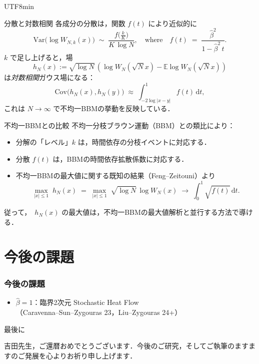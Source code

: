 \documentclass{beamer}
\newcommand{\IE}{\mathbb E}
\begin{document}
\begin{CJK*}{UTF8}{min}
\begin{frame}{分散と対数相関}
\small
各成分の分散は，関数 $f(t)$ により近似的に
\[
    \mathrm{Var}\bigl(\log W_{N,k}(x)\bigr) 
    \;\sim\; 
    \frac{f\bigl(\tfrac{k}{K}\bigr)}{K \,\log N},
    \quad
    \text{where}
    \quad
    f(t) \;=\; \frac{\hat{\beta}^2}{1 - \hat{\beta}^2\,t}.
\]
$k$ で足し上げると，場
\[
    h_N(x) := \sqrt{\log N}\,(\log W_N(\sqrt{N} x)-\IE \log W_N(\sqrt{N} x))
\]
は\emph{対数相関}ガウス場になる：
\[
    \mathrm{Cov}\bigl(h_N(x), h_N(y)\bigr)
    \;\approx\; 
    \int_{-2 \log |x-y|}^1 f(t) \, \mathrm{d}t,
\]
これは $N\to\infty$ で不均一BBMの挙動を反映している．
\end{frame}

\begin{frame}{不均一BBMとの比較}
\small
不均一分枝ブラウン運動（BBM）との類比により：
\begin{itemize}
    \item 分解の「レベル」$k$ は，時間依存の分枝イベントに対応する．
    \item 分散 $f(t)$ は，BBMの時間依存拡散係数に対応する．
    \item 不均一BBMの最大値に関する既知の結果（Feng--Zeitouni）より
\[
        \max_{|x|\le 1} \;h_N(x)
        \;=\;
        \max_{|x|\le 1} \;\sqrt{\log N}\,\log W_N(x)
        \;\longrightarrow\;
        \int_0^1 \sqrt{f(t)}\,\mathrm{d}t.
\]
\end{itemize}
従って，　$h_N(x)$ の最大値は，不均一BBMの最大値解析と並行する方法で導ける．

{\color{red}{厳密な証明では，十分良い近似のためにモーメント評価に関する良い評価が必要になる．}}
\end{frame}

\section{今後の課題}

\begin{frame}


\frametitle{今後の課題}
\begin{itemize}
\item<1-> $\hat \beta = 1$：臨界2次元 Stochastic Heat Flow\\
（Caravenna--Sun--Zygouras 23，Liu--Zygouras 24+）
\end{itemize}
\end{frame}
\begin{frame}{最後に}


{\Large  吉田先生，ご還暦おめでとうございます．今後のご研究，そしてご執筆のますますのご発展を心よりお祈り申し上げます．}
\end{frame}
\end{CJK*}
\end{document}

